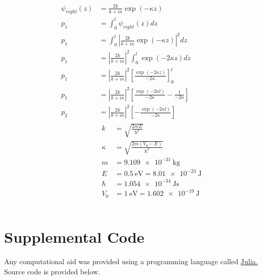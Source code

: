 {  \begin{align*}
    \psi_{right}(z) &= \frac{2k}{k + i\kappa}\exp(-\kappa z) \tag{2.43} \\
    p_1 &= \int_0^l \psi_{right}(z) dz\\
    p_1 &= \int_0^l\left|\frac{2k}{k + i\kappa}\exp(-\kappa z)\right|^2dz\\
    p_1 &= \left|\frac{2k}{k +
    i\kappa}\right|^2\int_0^l\exp(-2\kappa z)dz\\
    p_1 &= \left|\frac{2k}{k +
    i\kappa}\right|^2\left[\frac{\exp(-2\kappa z)}{-2\kappa}\right]_0^l\\
    p_1 &= \left|\frac{2k}{k +
    i\kappa}\right|^2\left[\frac{\exp(-2\kappa l)}{-2\kappa} -
    \frac{1}{-2\kappa}\right]\\
    p_2 &= \left|\frac{2k}{k +
    i\kappa}\right|^2\left[-\frac{\exp(-2\kappa l)}{-2\kappa}\right]\\
    &
    \begin{aligned}
      k &= \sqrt{\frac{2mE}{\hbar^2}} \\
      \kappa &= \sqrt{\frac{2m(V_0 - E)}{\hbar^2}} \\
      m &= \SI{9.109e-31}{\kilo\gram} \\
      E &= \SI{0.5}{\electronvolt} = \SI{8.01e-23}{\joule} \\
      \hbar &= \SI{1.054e-34}{\joule\second} \\
      V_0 &= \SI{1}{\electronvolt} = \SI{1.602e-19}{\joule} \\
    \end{aligned} \\
  \end{align*}

}

\pagebreak


\section*{Supplemental Code}

Any computational aid was provided using a programming language
called \href{https://julialang.org}{Julia.} Source code is provided below.

\inputminted{julia}{./calculations/src/calculations.jl}


